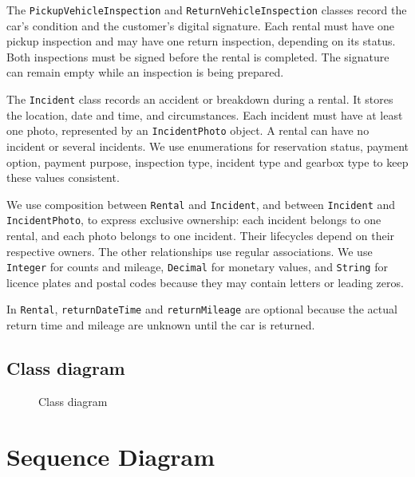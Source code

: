 \documentclass[12pt,a4paper]{report}
\begin{document}
The \texttt{PickupVehicleInspection} and \texttt{ReturnVehicleInspection} classes record the car's condition and the customer's digital signature.
Each rental must have one pickup inspection and may have one return inspection, depending on its status. Both inspections must be signed before the rental is completed.
The signature can remain empty while an inspection is being prepared.

The \texttt{Incident} class records an accident or breakdown during a rental. It stores the location, date and time, and circumstances. Each incident must have at least one photo, represented by an \texttt{IncidentPhoto} object. A rental can have no incident or several incidents. We use enumerations for reservation status, payment option, payment purpose, inspection type, incident type and gearbox type to keep these values consistent.

We use composition between \texttt{Rental} and \texttt{Incident}, and between \texttt{Incident} and \texttt{IncidentPhoto}, to express exclusive ownership: each incident belongs to one rental, and each photo belongs to one incident. Their lifecycles depend on their respective owners. The other relationships use regular associations. We use \texttt{Integer} for counts and mileage, \texttt{Decimal} for monetary values, and \texttt{String} for licence plates and postal codes because they may contain letters or leading zeros.

In \texttt{Rental}, \texttt{returnDateTime} and \texttt{returnMileage} are optional because the actual return time and mileage are unknown until the car is returned.
\section{Class diagram}
\begin{figure}[H]
    \centering
    \caption{Class diagram}
    \label{fig:class-diagram}
\end{figure}


\chapter{Sequence Diagram}
\end{document}
